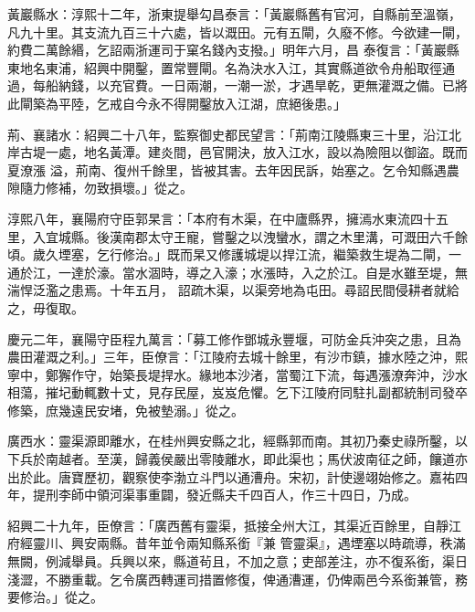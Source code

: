 \begin{pinyinscope}
 黃巖縣水：淳熙十二年，浙東提舉勾昌泰言：「黃巖縣舊有官河，自縣前至溫嶺，凡九十里。其支流九百三十六處，皆以溉田。元有五閘，久廢不修。今欲建一閘，約費二萬餘緡，乞詔兩浙運司于窠名錢內支撥。」明年六月，昌
 泰復言：「黃巖縣東地名東浦，紹興中開鑿，置常豐閘。名為決水入江，其實縣道欲令舟船取徑通過，每船納錢，以充官費。一日兩潮，一潮一淤，才遇旱乾，更無灌溉之備。已將此閘築為平陸，乞戒自今永不得開鑿放入江湖，庶絕後患。」



 荊、襄諸水：紹興二十八年，監察御史都民望言：「荊南江陵縣東三十里，沿江北岸古堤一處，地名黃潭。建炎間，邑官開決，放入江水，設以為險阻以御盜。既而夏潦漲
 溢，荊南、復州千餘里，皆被其害。去年因民訴，始塞之。乞令知縣遇農隙隨力修補，勿致損壞。」從之。



 淳熙八年，襄陽府守臣郭杲言：「本府有木渠，在中廬縣界，擁漹水東流四十五里，入宜城縣。後漢南郡太守王寵，嘗鑿之以洩蠻水，謂之木里溝，可溉田六千餘頃。歲久堙塞，乞行修治。」既而杲又修護城堤以捍江流，繼築救生堤為二閘，一通於江，一達於濠。當水涸時，導之入濠；水漲時，入之於江。自是水雖至堤，無湍悍泛濫之患焉。十年五月，
 詔疏木渠，以渠旁地為屯田。尋詔民間侵耕者就給之，毋復取。



 慶元二年，襄陽守臣程九萬言：「募工修作鄧城永豐堰，可防金兵沖突之患，且為農田灌溉之利。」三年，臣僚言：「江陵府去城十餘里，有沙市鎮，據水陸之沖，熙寧中，鄭獬作守，始築長堤捍水。緣地本沙渚，當蜀江下流，每遇漲潦奔沖，沙水相蕩，摧圮動輒數十丈，見存民屋，岌岌危懼。乞下江陵府同駐扎副都統制司發卒修築，庶幾遠民安堵，免被墊溺。」從之。



 廣西水：靈渠源即離水，在桂州興安縣之北，經縣郭而南。其初乃秦史祿所鑿，以下兵於南越者。至漢，歸義侯嚴出零陵離水，即此渠也；馬伏波南征之師，饟道亦出於此。唐寶歷初，觀察使李渤立斗門以通漕舟。宋初，計使邊翊始修之。嘉祐四年，提刑李師中領河渠事重闢，發近縣夫千四百人，作三十四日，乃成。



 紹興二十九年，臣僚言：「廣西舊有靈渠，抵接全州大江，其渠近百餘里，自靜江府經靈川、興安兩縣。昔年並令兩知縣系銜『兼
 管靈渠』，遇堙塞以時疏導，秩滿無闕，例減舉員。兵興以來，縣道茍且，不加之意；吏部差注，亦不復系銜，渠日淺澀，不勝重載。乞令廣西轉運司措置修復，俾通漕運，仍俾兩邑今系銜兼管，務要修治。」從之。



\end{pinyinscope}